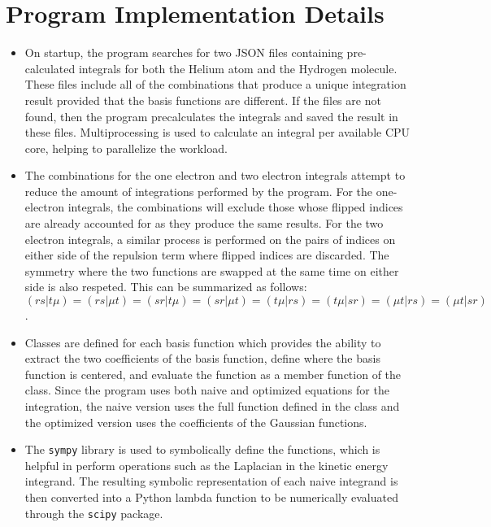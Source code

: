 \documentclass[10pt, oneside, letterpaper]{article}
\begin{document}
\section{Program Implementation Details}

\begin{itemize}
  \item On startup, the program searches for two JSON files containing pre-calculated integrals for both the Helium atom and the Hydrogen molecule. These files include all of the combinations that produce a unique integration result provided that the basis functions are different. If the files are not found, then the program precalculates the integrals and saved the result in these files. Multiprocessing is used to calculate an integral per available CPU core, helping to parallelize the workload.
  \item The combinations for the one electron and two electron integrals attempt to reduce the amount of integrations performed by the program. For the one-electron integrals, the combinations will exclude those whose flipped indices are already accounted for as they produce the same results. For the two electron integrals, a similar process is performed on the pairs of indices on either side of the repulsion term where flipped indices are discarded. The symmetry where the two functions are swapped at the same time on either side is also respeted. This can be summarized as follows:
  $(rs|t\mu) = (rs|\mu t) = (sr|t\mu) = (sr|\mu t) = (t\mu|rs) = (t\mu|sr) = (\mu t|rs) = (\mu t|sr)$ \cite{hartree-fock-in-100-lines}.
  \item Classes are defined for each basis function which provides the ability to extract the two coefficients of the basis function, define where the basis function is centered, and evaluate the function as a member function of the class. Since the program uses both naive and optimized equations for the integration, the naive version uses the full function defined in the class and the optimized version uses the coefficients of the Gaussian functions.
  \item The \texttt{sympy} library is used to symbolically define the functions, which is helpful in perform operations such as the Laplacian in the kinetic energy integrand. The resulting symbolic representation of each naive integrand is then converted into a Python lambda function to be numerically evaluated through the \texttt{scipy} package.
\end{itemize}

\end{document}
